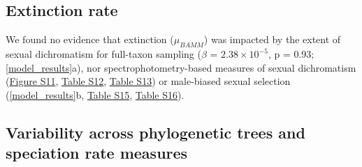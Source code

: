 \documentclass[]{article}
\begin{document}
\hypertarget{extinction-rate}{%
\subsection{Extinction rate}\label{extinction-rate}}

We found no evidence that extinction (\(\mu_{BAMM}\)) was impacted by
the extent of sexual dichromatism for full-taxon sampling (\(\beta\) =
\(2.38 \times 10^{-5}\), p = 0.93; \autoref{model_results}a), nor
spectrophotometry-based measures of sexual dichromatism
(\href{https://justincally.github.io/SexualSelection_Speciation/#subsetted_analysis_with_spectrophotometry_data}{Figure S11},
\href{https://justincally.github.io/SexualSelection_Speciation/#subsetted_analysis_with_spectrophotometry_data}{Table S12},
\href{https://justincally.github.io/SexualSelection_Speciation/#subsetted_analysis_with_spectrophotometry_data}{Table S13})
or male-biased sexual selection (\autoref{model_results}b,
\href{https://justincally.github.io/SexualSelection_Speciation/#analysis_using_male-biased_measure_of_sexual_selection}{Table S15},
\href{https://justincally.github.io/SexualSelection_Speciation/#analysis_using_male-biased_measure_of_sexual_selection}{Table S16}).

\hypertarget{variability-across-phylogenetic-trees-and-speciation-rate-measures}{%
\subsection{Variability across phylogenetic trees and speciation rate
measures}\label{variability-across-phylogenetic-trees-and-speciation-rate-measures}}
\end{document}
